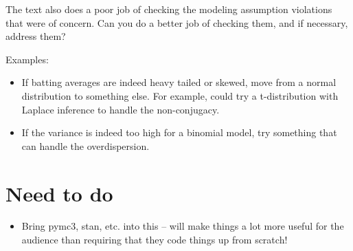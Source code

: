 \documentclass{article} %
\begin{document}
The text also does a poor job of checking the modeling assumption violations that were of concern.   Can you do a better job of checking them,  and if necessary,  address them?

Examples:
\begin{itemize}
\item If batting averages are indeed heavy tailed or skewed,  move from a normal distribution to something else.   For example,  could try a t-distribution with Laplace inference to handle the non-conjugacy. 
\item If the variance is indeed too high for a binomial model,  try something that can handle the overdispersion. 
\end{itemize}


\section{Need to do}

\begin{itemize}
\item {}  Bring pymc3,  stan,  etc.  into this -- will make things a lot more useful for the audience than requiring that they code things up from scratch!
\end{itemize}

%


          
\end{document}
